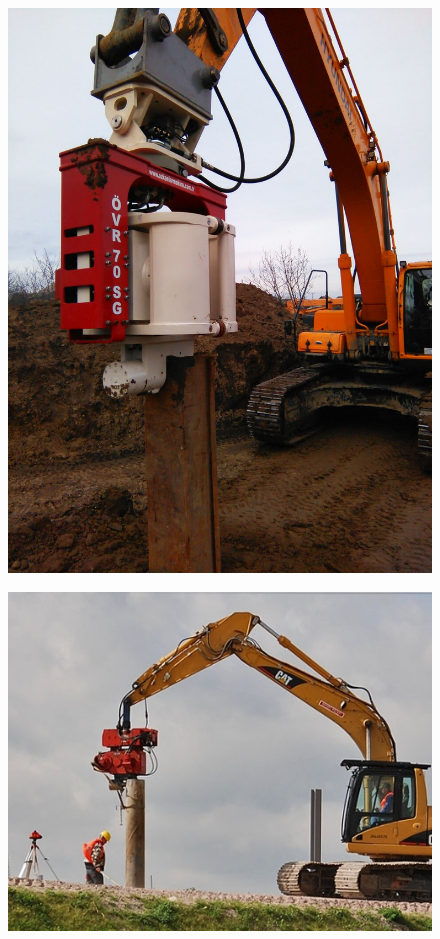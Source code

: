 \documentclass[10pt, pdf, hyperref={unicode}]{beamer}
\begin{document}
\begin{frame}
\begin{center}
\begin{minipage}[h]{0.97\linewidth}
\begin{minipage}[h]{0.22\linewidth}
\begin{figure}[h]
                        \includegraphics[width=1\linewidth]{../img/photo_2.jpg}
                    \end{figure}
                \end{minipage}
                \hfill
                \begin{minipage}[h]{0.29\linewidth}
                    \begin{figure}[h]
                        \centering
                        \includegraphics[width=1\linewidth]{../img/photo_3.jpg}

\end{figure}
\end{minipage}
\end{minipage}
\end{center}
\end{frame}
\end{document}
